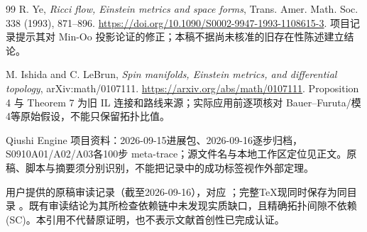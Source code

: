 \documentclass[UTF8,a4paper,11pt,fontset=fandol]{ctexart}
\numberwithin{equation}{section}
\theoremstyle{definition}
\begin{document}
\begin{thebibliography}{99}
 R. Ye, \emph{Ricci flow, Einstein metrics and space forms}, Trans. Amer. Math. Soc. 338 (1993), 871--896. \url{https://doi.org/10.1090/S0002-9947-1993-1108615-3}. 项目记录提示其对 Min-Oo 投影论证的修正；本稿不据尚未核准的旧存在性陈述建立结论。

 M. Ishida and C. LeBrun, \emph{Spin manifolds, Einstein metrics, and differential topology}, arXiv:math/0107111. \url{https://arxiv.org/abs/math/0107111}. Proposition 4 与 Theorem 7 为旧 IL 连接和路线来源；实际应用前逐项核对 Bauer--Furuta/模4等原始假设，不能只保留拓扑比值。

 Qiushi Engine 项目资料：2026-09-15进展包、2026-09-16逐步归档，S0910A01/A02/A03各100步 meta-trace；源文件名与本地工作区定位见正文。原稿、脚本与摘要须分别识别，不能把记录中的成功标签视作外部定理。

 用户提供的原稿审读记录（截至2026-09-16），对应 ；完整TeX现同时保存为同目录 。既有审读结论为其所检查依赖链中未发现实质缺口，且精确拓扑间隙不依赖(SC)。本引用不代替原证明，也不表示文献首创性已完成认证。

\end{thebibliography}
\end{document}
